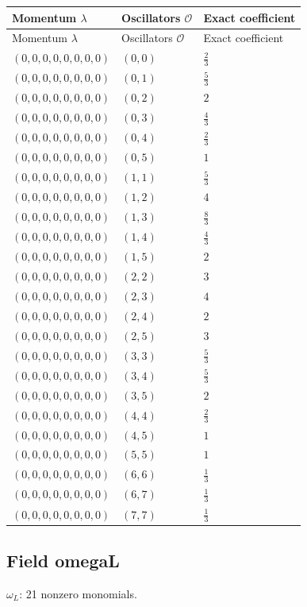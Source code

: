 \begingroup\scriptsize
\setlength{\tabcolsep}{5pt}
\begin{longtable}{@{}lll@{}}
\toprule
Momentum $\lambda$ & Oscillators $\mathcal O$ & Exact coefficient\\
\midrule\endfirsthead
\toprule
Momentum $\lambda$ & Oscillators $\mathcal O$ & Exact coefficient\\
\midrule\endhead
\bottomrule\endfoot
$(0,0,0,0,0,0,0,0)$ & $(0,0)$ & $\frac{2}{3}$\\
$(0,0,0,0,0,0,0,0)$ & $(0,1)$ & $\frac{5}{3}$\\
$(0,0,0,0,0,0,0,0)$ & $(0,2)$ & $2$\\
$(0,0,0,0,0,0,0,0)$ & $(0,3)$ & $\frac{4}{3}$\\
$(0,0,0,0,0,0,0,0)$ & $(0,4)$ & $\frac{2}{3}$\\
$(0,0,0,0,0,0,0,0)$ & $(0,5)$ & $1$\\
$(0,0,0,0,0,0,0,0)$ & $(1,1)$ & $\frac{5}{3}$\\
$(0,0,0,0,0,0,0,0)$ & $(1,2)$ & $4$\\
$(0,0,0,0,0,0,0,0)$ & $(1,3)$ & $\frac{8}{3}$\\
$(0,0,0,0,0,0,0,0)$ & $(1,4)$ & $\frac{4}{3}$\\
$(0,0,0,0,0,0,0,0)$ & $(1,5)$ & $2$\\
$(0,0,0,0,0,0,0,0)$ & $(2,2)$ & $3$\\
$(0,0,0,0,0,0,0,0)$ & $(2,3)$ & $4$\\
$(0,0,0,0,0,0,0,0)$ & $(2,4)$ & $2$\\
$(0,0,0,0,0,0,0,0)$ & $(2,5)$ & $3$\\
$(0,0,0,0,0,0,0,0)$ & $(3,3)$ & $\frac{5}{3}$\\
$(0,0,0,0,0,0,0,0)$ & $(3,4)$ & $\frac{5}{3}$\\
$(0,0,0,0,0,0,0,0)$ & $(3,5)$ & $2$\\
$(0,0,0,0,0,0,0,0)$ & $(4,4)$ & $\frac{2}{3}$\\
$(0,0,0,0,0,0,0,0)$ & $(4,5)$ & $1$\\
$(0,0,0,0,0,0,0,0)$ & $(5,5)$ & $1$\\
$(0,0,0,0,0,0,0,0)$ & $(6,6)$ & $\frac{1}{3}$\\
$(0,0,0,0,0,0,0,0)$ & $(6,7)$ & $\frac{1}{3}$\\
$(0,0,0,0,0,0,0,0)$ & $(7,7)$ & $\frac{1}{3}$\\
\end{longtable}
\endgroup

\subsection{Field omegaL}
$\omega_L$: 21 nonzero monomials.

